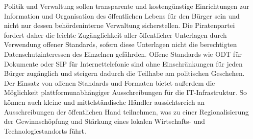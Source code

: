   Politik und Verwaltung sollen transparente und kostengünstige Einrichtungen 
  zur Information und Organisation des öffentlichen Lebens für den Bürger sein 
  und nicht nur dessen behördeninterne Verwaltung sicherstellen. Die 
  Piratenpartei fordert daher die leichte Zugänglichkeit aller öffentlicher 
  Unterlagen durch Verwendung offener Standards, sofern diese Unterlagen nicht 
  die berechtigten Datenschutzinteressen des Einzelnen gefährden. Offene 
  Standards wie ODT für Dokumente oder SIP für Internettelefonie sind ohne 
  Einschränkungen für jeden Bürger zugänglich und steigern dadurch die 
  Teilhabe am politischen Geschehen. Der Einsatz von offenen Standards und 
  Formaten bietet außerdem die Möglichkeit plattformunabhängiger 
  Ausschreibungen für die IT-Infrastruktur. So können auch kleine und 
  mittelständische Händler aussichtsreich an Ausschreibungen der öffentlichen 
  Hand teilnehmen, was zu einer Regionalisierung der Gewinnschöpfung und 
  Stärkung eines lokalen Wirtschafts- und Technologiestandorts führt.
